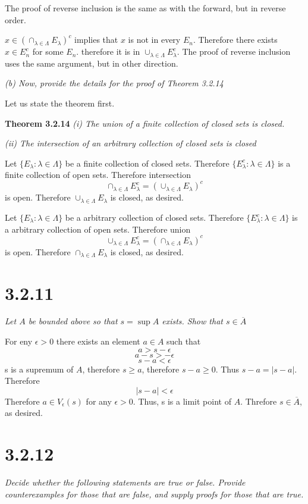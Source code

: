 \documentclass[11pt,oneside,titlepage]{article}
\begin{document}
The proof of reverse inclusion is the same as with the forward, but in reverse
order.

$x \in \left(\cap_{\lambda \in \Lambda} E_\lambda \right)^c$ implies that
$x$ is not in every $E_n$. Therefore there exists $x \in E_n^c$ for some $E_n$.
therefore it is in $\cup_{\lambda \in \Lambda} E_\lambda^c$. The proof of
reverse inclusion uses the same argument, but in other direction.

\textit{(b) Now, provide the details for the proof of Theorem 3.2.14}

Let us state the theorem first.

\textbf{Theorem 3.2.14}
\textit{(i) The union of a finite collection of closed sets is closed.}

\textit{(ii) The intersection of an arbitrary collection of closed sets is closed}

Let $\{E_\lambda: \lambda \in \Lambda\}$ be a finite collection of closed sets.
Therefore $\{E_\lambda^c: \lambda \in \Lambda\}$ is a finite collection of open
sets. Therefore intersection
$$\cap_{\lambda \in \Lambda} E_\lambda^c = (\cup_{\lambda \in \Lambda} E_\lambda)^c$$
is open. Therefore $\cup_{\lambda \in \Lambda} E_\lambda$ is closed, as desired.

Let $\{E_\lambda: \lambda \in \Lambda\}$ be a arbitrary collection of closed sets.
Therefore $\{E_\lambda^c: \lambda \in \Lambda\}$ is a arbitrary collection of open
sets. Therefore union
$$\cup_{\lambda \in \Lambda} E_\lambda^c = (\cap_{\lambda \in \Lambda} E_\lambda)^c$$
is open. Therefore $\cap_{\lambda \in \Lambda} E_\lambda$ is closed, as desired.

\section*{3.2.11}
\textit{Let $A$ be bounded above so that $s = \sup A$ exists. Show that
  $s \in \overline A$}

For eny $\epsilon > 0$ there exists an element $a \in A$ such that
$$a > s - \epsilon$$
$$a - s > - \epsilon$$
$$s - a < \epsilon$$
s is a supremum of $A$, therefore $s \geq a$, therefore $s - a \geq 0$. Thus
$s - a = |s - a|$. Therefore 
$$|s - a| < \epsilon$$
Therefore $a \in V_\epsilon(s)$ for any $\epsilon > 0$. Thus, s is a limit point of
$A$. Threfore $s \in \overline A$, as desired.

\section*{3.2.12}
\textit{Decide whether the following statements are true or false. Provide counterexamples for those that are false, and supply proofs for those that are true.}
\end{document}
